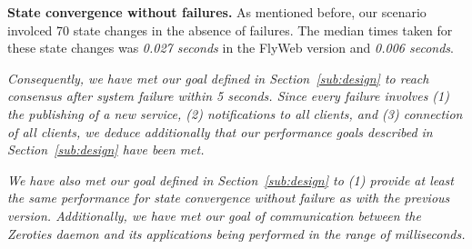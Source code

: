 \textbf{State convergence without failures.}
As mentioned before, our scenario involced 70 state changes in the absence of failures. The median times taken for these state changes was \textit{0.027 seconds} in the FlyWeb version and \textit{0.006 seconds}. 

\textit{Consequently, we have met our goal defined in Section~\ref{sub:design} to reach consensus after system failure within 5 seconds.
Since every failure involves (1) the publishing of a new service, (2) notifications to all clients, and (3) connection of all clients, we deduce additionally that our performance goals described in Section~\ref{sub:design} have been met.}

\textit{We have also met our goal defined in Section~\ref{sub:design} to (1) provide at least the same performance for state convergence without failure as with the previous version. Additionally, we have met our goal of communication between the Zeroties daemon and its applications being performed in the range of milliseconds.}
